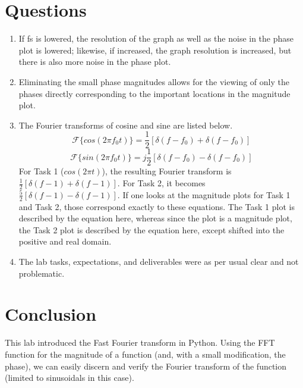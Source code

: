 \documentclass[11pt,a4,titlepage]{article}
\begin{document}
\section{Questions}
\begin{enumerate}
	\item If fs is lowered, the resolution of the graph as well as the noise in the phase plot is lowered; likewise, if increased, the graph resolution is increased, but there is also more noise in the phase plot.
	\item Eliminating the small phase magnitudes allows for the viewing of only the phases directly corresponding to the important locations in the magnitude plot.
	\item The Fourier transforms of cosine and sine are listed below.
	\[\mathcal{F}\{cos(2\pi f_{0}t)\} = \frac{1}{2}[\delta (f - f_{0}) + \delta (f - f_{0})]\]
	\[\mathcal{F}\{sin(2\pi f_{0}t)\} = j\frac{1}{2}[\delta (f - f_{0}) - \delta (f - f_{0})]\]
	For Task 1 ($cos(2\pi t)$), the resulting Fourier transform is $\frac{1}{2}[\delta (f - 1) + \delta (f - 1)]$. For Task 2, it becomes $\frac{5}{2}[\delta (f - 1) - \delta (f - 1)]$. If one looks at the magnitude plots for Task 1 and Task 2, those correspond exactly to these equations. The Task 1 plot is described by the equation here, whereas since the plot is a magnitude plot, the Task 2 plot is described by the equation here, except shifted into the positive and real domain.
	\item The lab tasks, expectations, and deliverables were as per usual clear and not problematic.
\end{enumerate}

\section{Conclusion}
This lab introduced the Fast Fourier transform in Python. Using the FFT function for the magnitude of a function (and, with a small modification, the phase), we can easily discern and verify the Fourier transform of the function (limited to sinusoidals in this case).
\end{document}
